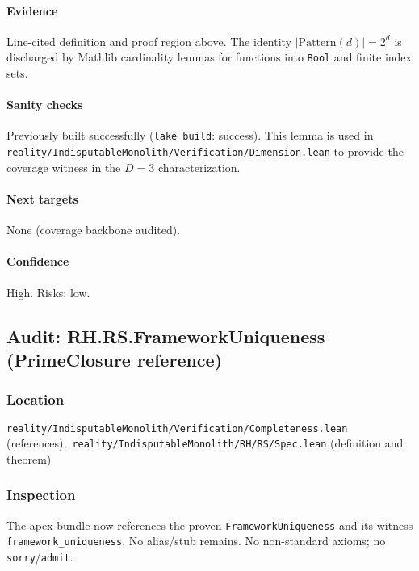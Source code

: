 \documentclass{article}
\newcommand{\FileRef}[1]{\texttt{#1}}
\begin{document}
\paragraph{Evidence}
Line-cited definition and proof region above. The identity \(|\mathrm{Pattern}(d)|=2^d\) is discharged by Mathlib cardinality lemmas for functions into \texttt{Bool} and finite index sets.

\paragraph{Sanity checks}
Previously built successfully (\texttt{lake build}: success). This lemma is used in \FileRef{reality/IndisputableMonolith/Verification/Dimension.lean} to provide the coverage witness in the \(D=3\) characterization.

\paragraph{Next targets} None (coverage backbone audited).

\paragraph{Confidence} High. Risks: low.

\subsection{Audit: RH.RS.FrameworkUniqueness (PrimeClosure reference)}
\subsubsection{Location}
\FileRef{reality/IndisputableMonolith/Verification/Completeness.lean} (references),\
\FileRef{reality/IndisputableMonolith/RH/RS/Spec.lean} (definition and theorem)

\subsubsection{Inspection}
The apex bundle now references the proven \texttt{FrameworkUniqueness} and its witness \texttt{framework\_uniqueness}. No alias/stub remains. No non-standard axioms; no \texttt{sorry}/\texttt{admit}.
\end{document}
